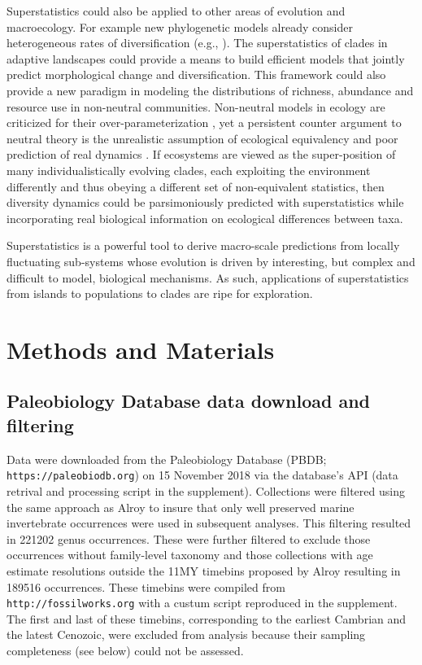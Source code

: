 \documentclass[12pt]{article}
\let\citep=\cite
\begin{document}
Superstatistics could also be applied to other areas of evolution and
macroecology.  For example new phylogenetic models already consider
heterogeneous rates of diversification (e.g.,
\citep{rabosky2006laser}). The superstatistics of clades in adaptive
landscapes could provide a means to build efficient models that
jointly predict morphological change and diversification. This
framework could also provide a new paradigm in modeling the
distributions of richness, abundance and resource use in non-neutral
communities. Non-neutral models in ecology are criticized for their
over-parameterization \citep{rosindell2011}, yet a persistent counter
argument to neutral theory \citep{hubbell2001} is the unrealistic
assumption of ecological equivalency \citep{chave2004neutral} and poor
prediction of real dynamics \citep{ricklefs2006neutral}. If ecosystems
are viewed as the super-position of many individualistically evolving
clades, each exploiting the environment differently and thus obeying a
different set of non-equivalent statistics, then diversity dynamics
could be parsimoniously predicted with superstatistics while
incorporating real biological information on ecological differences
between taxa.

Superstatistics is a powerful tool to derive macro-scale predictions
from locally fluctuating sub-systems whose evolution is driven by
interesting, but complex and difficult to model, biological
mechanisms. As such, applications of superstatistics from islands to
populations to clades are ripe for exploration.


\section*{Methods and Materials}

\subsection*{Paleobiology Database data download and filtering}
Data were downloaded from the Paleobiology Database (PBDB; {\tt
  https://paleobiodb.org}) on 15 November 2018 via the database's API
(data retrival and processing script in the supplement). Collections
were filtered using the same approach as Alroy \citep{alroy08} to
insure that only well preserved marine invertebrate occurrences were
used in subsequent analyses. This filtering resulted in 221202 genus
occurrences. These were further filtered to exclude those occurrences
without family-level taxonomy and those collections with age estimate
resolutions outside the 11MY timebins proposed by Alroy
\citep{alroy08} resulting in 189516 occurrences. These timebins were
compiled from {\tt http://fossilworks.org} with a custum script
reproduced in the supplement. The first and last of these timebins,
corresponding to the earliest Cambrian and the latest Cenozoic, were
excluded from analysis because their sampling completeness (see below)
could not be assessed.
\end{document}
